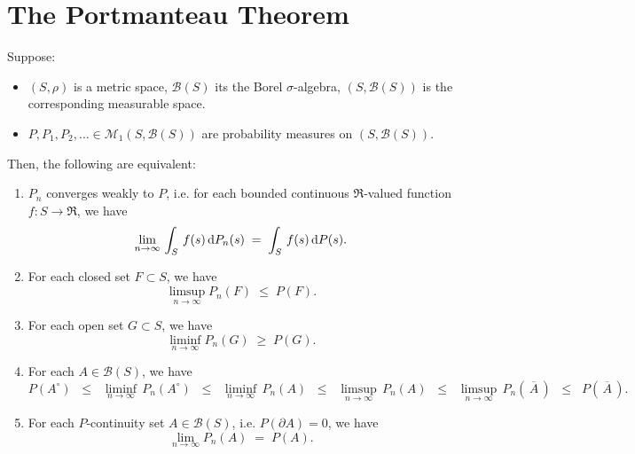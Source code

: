 

\section{The Portmanteau Theorem}
\setcounter{theorem}{0}
\setcounter{equation}{0}

\renewcommand{\theenumi}{\roman{enumi}}
\renewcommand{\labelenumi}{\textnormal{(\theenumi)}$\;\;$}

\begin{theorem}
\label{PortmanteauTheorem}
\mbox{}\vskip 0.2cm
\noindent
Suppose:
\begin{itemize}
\item	$\left(S,\rho\right)$ is a metric space, $\mathcal{B}(S)$ its the Borel $\sigma$-algebra,
		$\left(S,\mathcal{B}(S)\right)$ is the corresponding measurable space.
\item	$P, P_{1}, P_{2}, \ldots \in \mathcal{M}_{1}\!\left(S,\mathcal{B}(S)\right)$
		are probability measures on $\left(S,\mathcal{B}(S)\right)$.
\end{itemize}
Then, the following are equivalent:
\begin{enumerate}
\item	$P_{n}$ converges weakly to $P$,
		i.e. for each bounded continuous $\Re$-valued function $f : S \longrightarrow \Re$, we have
		\begin{equation*}
		\lim_{n\rightarrow\infty}\,\int_{S}\,f(s)\,\textnormal{d} P_{n}(s) \;=\; \int_{S}\,f(s)\,\textnormal{d} P(s).
		\end{equation*}
\item	For each closed set $F \subset S$, we have
		\begin{equation*}
		\limsup_{n\rightarrow\infty}P_{n}(F) \;\leq\; P(F).
		\end{equation*}
\item	For each open set $G \subset S$, we have
		\begin{equation*}
		\liminf_{n\rightarrow\infty}P_{n}(G) \;\geq\; P(G).
		\end{equation*}
\item	For each $A \in \mathcal{B}(S)$, we have
		\begin{equation*}
		P\!\left(A^{\circ}\right)
		\;\;\leq\;\; \liminf_{n\rightarrow\infty}\,P_{n}\!\left(A^{\circ}\right)
		\;\;\leq\;\; \liminf_{n\rightarrow\infty}\,P_{n}\!\left(A\right)
		\;\;\leq\;\; \limsup_{n\rightarrow\infty}\,P_{n}\!\left(A\right)
		\;\;\leq\;\; \limsup_{n\rightarrow\infty}\,P_{n}\!\left(\,\overline{A}\,\right)
		\;\;\leq\;\; P\!\left(\,\overline{A}\,\right).
		\end{equation*}
\item	For each $P$-continuity set $A \in \mathcal{B}(S)$, i.e. $P(\partial A) = 0$, we have
		\begin{equation*}
		\lim_{n\rightarrow\infty}P_{n}(A) \;=\; P(A).
		\end{equation*}
\end{enumerate}
\end{theorem}


